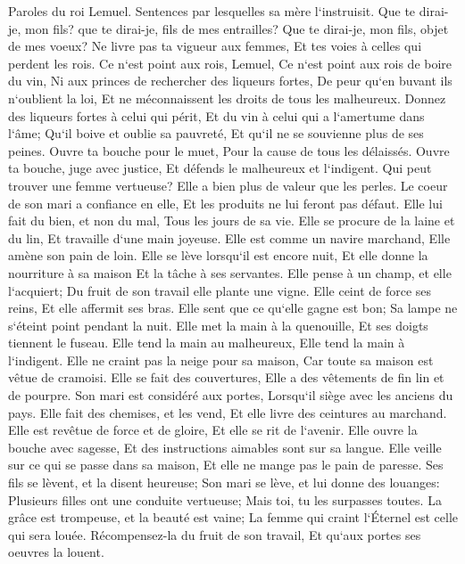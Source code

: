 \verse Paroles du roi Lemuel. Sentences par lesquelles sa mère l`instruisit. 
\verse Que te dirai-je, mon fils? que te dirai-je, fils de mes entrailles? Que te dirai-je, mon fils, objet de mes voeux? 
\verse Ne livre pas ta vigueur aux femmes, Et tes voies à celles qui perdent les rois. 
\verse Ce n`est point aux rois, Lemuel, Ce n`est point aux rois de boire du vin, Ni aux princes de rechercher des liqueurs fortes, 
\verse De peur qu`en buvant ils n`oublient la loi, Et ne méconnaissent les droits de tous les malheureux. 
\verse Donnez des liqueurs fortes à celui qui périt, Et du vin à celui qui a l`amertume dans l`âme; 
\verse Qu`il boive et oublie sa pauvreté, Et qu`il ne se souvienne plus de ses peines. 
\verse Ouvre ta bouche pour le muet, Pour la cause de tous les délaissés. 
\verse Ouvre ta bouche, juge avec justice, Et défends le malheureux et l`indigent. 
\verse Qui peut trouver une femme vertueuse? Elle a bien plus de valeur que les perles. 
\verse Le coeur de son mari a confiance en elle, Et les produits ne lui feront pas défaut. 
\verse Elle lui fait du bien, et non du mal, Tous les jours de sa vie. 
\verse Elle se procure de la laine et du lin, Et travaille d`une main joyeuse. 
\verse Elle est comme un navire marchand, Elle amène son pain de loin. 
\verse Elle se lève lorsqu`il est encore nuit, Et elle donne la nourriture à sa maison Et la tâche à ses servantes. 
\verse Elle pense à un champ, et elle l`acquiert; Du fruit de son travail elle plante une vigne. 
\verse Elle ceint de force ses reins, Et elle affermit ses bras. 
\verse Elle sent que ce qu`elle gagne est bon; Sa lampe ne s`éteint point pendant la nuit. 
\verse Elle met la main à la quenouille, Et ses doigts tiennent le fuseau. 
\verse Elle tend la main au malheureux, Elle tend la main à l`indigent. 
\verse Elle ne craint pas la neige pour sa maison, Car toute sa maison est vêtue de cramoisi. 
\verse Elle se fait des couvertures, Elle a des vêtements de fin lin et de pourpre. 
\verse Son mari est considéré aux portes, Lorsqu`il siège avec les anciens du pays. 
\verse Elle fait des chemises, et les vend, Et elle livre des ceintures au marchand. 
\verse Elle est revêtue de force et de gloire, Et elle se rit de l`avenir. 
\verse Elle ouvre la bouche avec sagesse, Et des instructions aimables sont sur sa langue. 
\verse Elle veille sur ce qui se passe dans sa maison, Et elle ne mange pas le pain de paresse. 
\verse Ses fils se lèvent, et la disent heureuse; Son mari se lève, et lui donne des louanges: 
\verse Plusieurs filles ont une conduite vertueuse; Mais toi, tu les surpasses toutes. 
\verse La grâce est trompeuse, et la beauté est vaine; La femme qui craint l`Éternel est celle qui sera louée. 
\verse Récompensez-la du fruit de son travail, Et qu`aux portes ses oeuvres la louent. 
